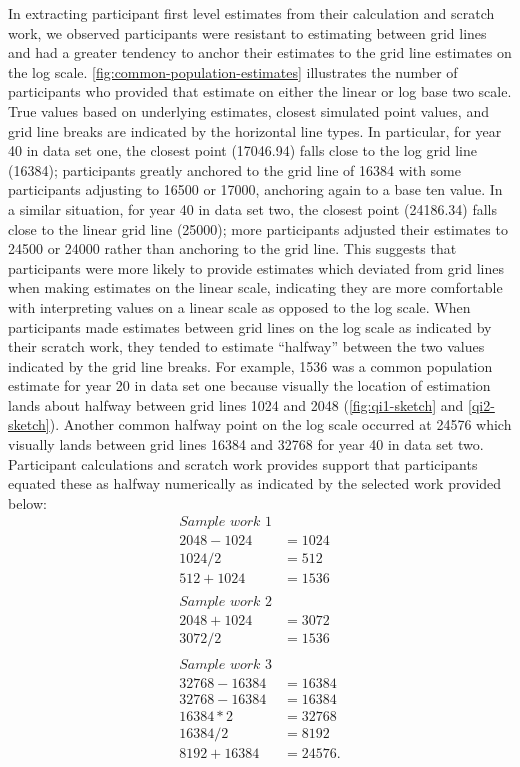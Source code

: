 \documentclass[print]{nuthesis}
\begin{document}
In extracting participant first level estimates from their calculation and scratch work, we observed participants were resistant to estimating between grid lines and had a greater tendency to anchor their estimates to the grid line estimates on the log scale.
\cref{fig:common-population-estimates} illustrates the number of participants who provided that estimate on either the linear or log base two scale.
True values based on underlying estimates, closest simulated point values, and grid line breaks are indicated by the horizontal line types.
In particular, for year 40 in data set one, the closest point (17046.94) falls close to the log grid line (16384); participants greatly anchored to the grid line of 16384 with some participants adjusting to 16500 or 17000, anchoring again to a base ten value.
In a similar situation, for year 40 in data set two, the closest point (24186.34) falls close to the linear grid line (25000); more participants adjusted their estimates to 24500 or 24000 rather than anchoring to the grid line.
This suggests that participants were more likely to provide estimates which deviated from grid lines when making estimates on the linear scale, indicating they are more comfortable with interpreting values on a linear scale as opposed to the log scale.
When participants made estimates between grid lines on the log scale as indicated by their scratch work, they tended to estimate ``halfway'' between the two values indicated by the grid line breaks.
For example, 1536 was a common population estimate for year 20 in data set one because visually the location of estimation lands about halfway between grid lines 1024 and 2048 (\cref{fig:qi1-sketch} and \cref{qi2-sketch}).
Another common halfway point on the log scale occurred at 24576 which visually lands between grid lines 16384 and 32768 for year 40 in data set two.
Participant calculations and scratch work provides support that participants equated these as halfway numerically as indicated by the selected work provided below:
\begin{align}
\textit{Sample work 1} \nonumber\\
2048-1024 &= 1024 \nonumber \\
1024/2 &= 512 \nonumber\\
512+1024 &= 1536 \nonumber
\nonumber \\ 
\nonumber \\
\textit{Sample work 2} \nonumber\\
2048 + 1024 & =3072 \nonumber\\
3072/2 & =1536 \nonumber
\nonumber \\ 
\nonumber \\
\textit{Sample work 3} \nonumber\\
32768-16384&=16384  \nonumber\\
32768-16384&=16384  \nonumber\\
16384*2&=32768  \nonumber\\
16384/2&=8192  \nonumber\\
8192+16384&=24576.  \nonumber
\end{align}
\end{document}
